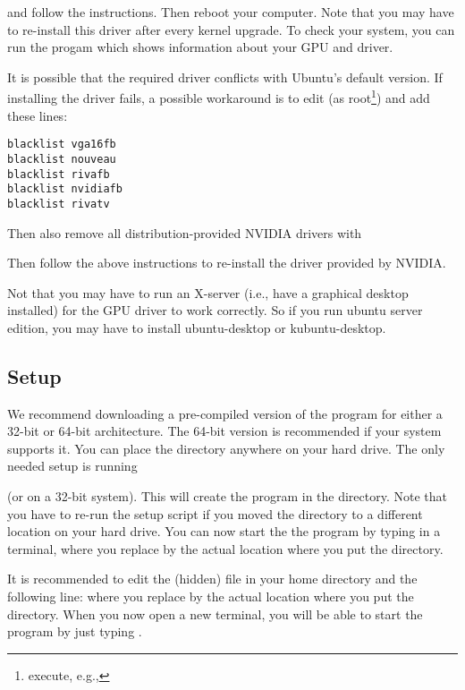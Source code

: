 
and follow the instructions. Then reboot your computer. Note that you may have to re-install this driver after every kernel upgrade. To check your system, you can run the progam  which shows information about your GPU and driver.

It is possible that the required driver conflicts with Ubuntu's default version. If installing the driver fails, a possible workaround is to edit  (as root\footnote{execute, e.g., }) and add these lines:
\small
\begin{verbatim}
blacklist vga16fb
blacklist nouveau
blacklist rivafb
blacklist nvidiafb
blacklist rivatv
\end{verbatim}
\normalsize

Then also remove all distribution-provided \textsc{NVIDIA} drivers with


Then follow the above instructions to re-install the driver provided by \textsc{NVIDIA}.

Not that you may have to run an X-server (i.e., have a graphical desktop installed) for the GPU driver to work correctly. So if you run ubuntu server edition, you may have to install ubuntu-desktop or kubuntu-desktop.

\subsection{Setup}

We recommend downloading a pre-compiled version of the program for either a 32-bit or 64-bit architecture. The 64-bit version is recommended if your system supports it. You can place the \prog directory anywhere on your hard drive. The only needed setup is running 


(or  on a 32-bit system). This will create the \cmd{\prog} program in the  directory. Note that you have to re-run the setup 
script if you moved the \prog directory to a different location on your hard drive. You can now start the the program by typing  in a terminal, where you replace  by the actual location where you put the \prog directory.

It is recommended to edit the (hidden)  file in your home directory and the following line:  where you replace  by the actual location where you put the \prog directory. When you now open a new terminal, you will be able to start the program by just typing \prog.


